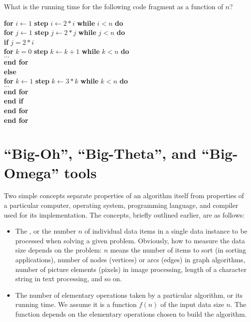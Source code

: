 \begin{Exercise}
\label{ex:nest2}

What is the running time for the following code fragment as a function of $n$?
\begin{center}
\begin{minipage}{5in}
\Algorbody
{
\textbf{for} $i \gets 1$ \textbf{step} $i \gets 2*i$ \textbf{while} $i<n$ \textbf{do} \\
\> \textbf{for} $j \gets 1$ \textbf{step} $j \gets 2*j$ \textbf{while} $j<n$ \textbf{do} \\
\> \> \textbf{if} $j = 2*i$ \\
\> \> \> \textbf{for} $k = 0$ \textbf{step} $k\gets k+1$ \textbf{while} $k<n$ \textbf{do} \\
\> \> \> \> $\ldots$  \\
\>\>\> \textbf{end for}\\
\> \> \textbf{else} \\
\> \> \> \textbf{for} $k \gets 1$ \textbf{step} $k\gets 3*k$ \textbf{while} $k<n$ \textbf{do} \\
\> \> \> \> $\ldots$  \\
\>\>\> \textbf{end for}\\
\>\> \textbf{end if} \\
\> \textbf{end for} \\
\textbf{end for}
}
\end{minipage}
\end{center}
\end{Exercise}

\section{``Big-Oh'', ``Big-Theta'', and ``Big-Omega'' tools} \label{tools}

Two simple concepts separate properties of an algorithm itself from
properties of a particular computer, operating system, programming
language, and compiler used for its implementation. The concepts,
briefly outlined earlier, are as follows: 
\begin{itemize}
 \item The , or
the number $n$ of individual data items in a single data instance to be
processed when solving a given problem. Obviously, how to measure the data
size depends on the problem: \(n\) means the number of items to sort (in sorting
applications),
number of nodes (vertices) or arcs (edges) in graph algorithms, number
of picture elements (pixels) in image processing, length of a character
string in text processing, and so on.  
\item The number of elementary operations taken by a particular algorithm, or its
running time. We assume it is a function $f(n)$ of the input data size
$n$. The function depends on the elementary operations chosen to build the
algorithm. 
\end{itemize} 

